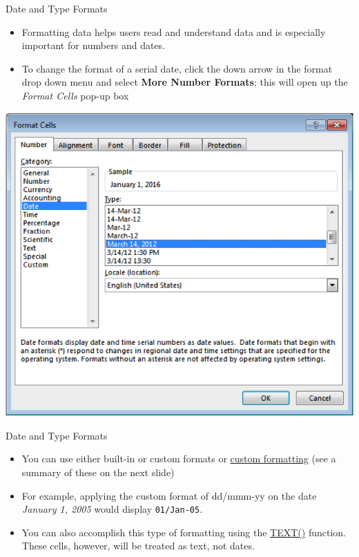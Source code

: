 \documentclass[xcolor=svgnames]{beamer}
\begin{document}
\begin{frame}{Date and Type Formats}
\begin{itemize}
\item Formatting data helps users read and understand data and is especially important for numbers and dates. 
\item To change the format of a serial date, click the down arrow in the format drop down menu and select {\bf More Number Formats}; this will open up the \textit{Format Cells} pop-up box
\end{itemize}
\begin{center}
 \includegraphics[height=.6\textheight]{DateType}
\end{center}
\end{frame}




\begin{frame}{Date and Type Formats}
\begin{itemize}
\item You can use either built-in or custom formats or  \href{https://www.ablebits.com/office-addins-blog/2015/03/11/change-date-format-excel/\#custom-date-format}{custom formatting} (see a summary of these on the next slide)
\medskip
\item For example, applying the custom format of {\sf dd/mmm-yy} on the 
date \textit{January 1, 2005} would display {\tt 01/Jan-05}.
\medskip
\item You can also accomplish this type of formatting using the \href{https://www.ablebits.com/office-addins-blog/2015/04/08/convert-date-text-excel/}{TEXT()} function.  These cells, however, will be treated as text, not dates. 
\end{itemize}
\end{frame}
\end{document}
